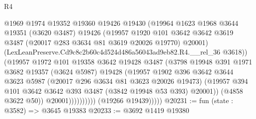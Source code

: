 \begin{lexlean}{R4}
\begin{coremodule}
                              @1969
                              @1974
                              @19352
                              @19360
                              @19426
                              @19430
                              (@19964
                                @1623
                                @1968
                                @3644
                                @19351
                                (@3620 @3487)
                                @19426
                                (@19957
                                  @1920
                                  @101
                                  @3642
                                  @3642
                                  @3619
                                  @3487
                                  (@20017 @283 @3634 @81 @3619 @20026 @19770)
                                  @20001)
                                (LexLeanPreserve.Cd9c8c2b60c4d524d486a56043ad9eb82.R4.__rel_36
                                  @3618))
                              (@19957
                                @1972
                                @101
                                @19358
                                @3642
                                @19428
                                @3487
                                (@3798
                                  @19948
                                  @391
                                  @1971
                                  @3682
                                  @19357
                                  (@3624 @5987)
                                  @19428
                                  (@19957
                                    @1902
                                    @396
                                    @3642
                                    @3644
                                    @3623
                                    @5987
                                    (@20017 @296 @3634 @81 @3623 @20026 @19473)
                                    (@19957
                                      @394
                                      @101
                                      @3642
                                      @3642
                                      @393
                                      @3487
                                      (@3842 @19948 @53 @393)
                                      @20001))
                                  (@4858 @3622 @50))
                                @20001))))))))))
            (@19266 @19439)))))
@20231 := fun (state : @3582) => @3645 @19383
@20233 := @3692 @1419 @19380

\end{coremodule}
\end{lexlean}
